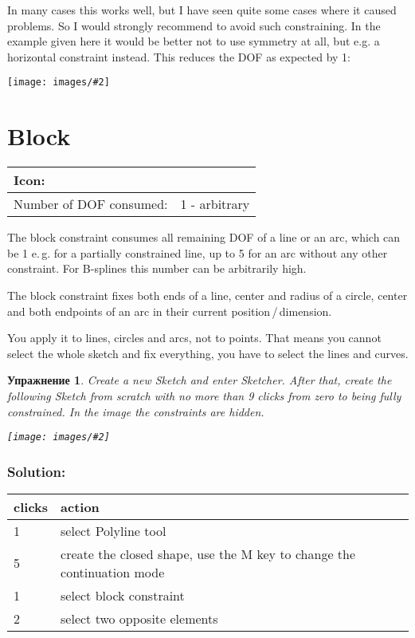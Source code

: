 \documentclass[12pt,titlepage]{article}
\newcommand{\icon}[1]{\raisebox{-1em}{\rule{0pt}{27pt}\texttt{[image: images/\#1]}}}
\newcommand{\img}[2]{\vspace{2ex}\noindent\texttt{[image: images/\#2]}}
\newcommand{\dofConsumed}{Number of DOF consumed:}
\newtheorem{Exercise}{Упражнение}
\begin{document}
In many cases this works well, but I have seen quite some cases where it
caused problems. So I would strongly recommend to avoid such constraining. In
the example given here it would be better not to use symmetry at all, but e.g.
a horizontal constraint instead. This reduces the DOF as expected by 1:

\img{width=0.6\textwidth}{SymmetryPatho4}


\section{Block}
\begin{tabular}{|l|l|}
\hline
Icon: & \icon{Sketcher_ConstrainBlock}\\
\hline
\dofConsumed & 1 - arbitrary \\
\hline
\end{tabular}

The block constraint consumes all remaining DOF of a line or an arc, which can
be 1 e.\,g. for a partially constrained line, up to 5 for an arc without any other
constraint. For B-splines this number can be arbitrarily high.

The block constraint fixes both ends of a line, center and radius of a circle,
center and both endpoints of an arc in their current position\,/\,dimension.

You apply it to lines, circles and arcs, not to points. That means you cannot
select the whole sketch and fix everything, you have to select the lines and
curves.

\begin{Exercise}
Create a new Sketch and enter Sketcher. After that, create the following
Sketch from scratch with no more than 9 clicks from zero to being fully
constrained. In the image the constraints are hidden.

\img{}{BlockHidden}
\end{Exercise}

\subsubsection*{Solution:} 

\begin{tabular}{|l|l|}
\hline
{\bf clicks} & {\bf action}\\
\hline
1  & select Polyline tool\\
5  & create the closed shape, use the M key to change the continuation mode\\
1  & select block constraint\\
2  & select two opposite elements\\
\hline
\end{tabular}
\end{document}
